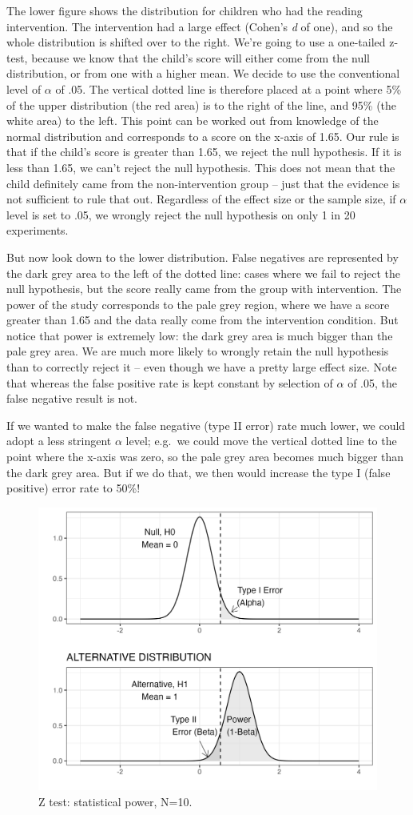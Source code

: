 \documentclass{krantz}
\begin{document}
The lower figure shows the distribution for children who had the reading intervention. The intervention had a large effect (Cohen's \emph{d} of one), and so the whole distribution is shifted over to the right. We're going to use a one-tailed z-test, because we know that the child's score will either come from the null distribution, or from one with a higher mean. We decide to use the conventional level of \(\alpha\) of .05. The vertical dotted line is therefore placed at a point where 5\% of the upper distribution (the red area) is to the right of the line, and 95\% (the white area) to the left. This point can be worked out from knowledge of the normal distribution and corresponds to a score on the x-axis of 1.65. Our rule is that if the child's score is greater than 1.65, we reject the null hypothesis. If it is less than 1.65, we can't reject the null hypothesis. This does not mean that the child definitely came from the non-intervention group -- just that the evidence is not sufficient to rule that out. Regardless of the effect size or the sample size, if \(\alpha\) level is set to .05, we wrongly reject the null hypothesis on only 1 in 20 experiments.

But now look down to the lower distribution. False negatives are represented by the dark grey area to the left of the dotted line: cases where we fail to reject the null hypothesis, but the score really came from the group with intervention. The power of the study corresponds to the pale grey region, where we have a score greater than 1.65 and the data really come from the intervention condition. But notice that power is extremely low: the dark grey area is much bigger than the pale grey area. We are much more likely to wrongly retain the null hypothesis than to correctly reject it -- even though we have a pretty large effect size. Note that whereas the false positive rate is kept constant by selection of \(\alpha\) of .05, the false negative result is not.

If we wanted to make the false negative (type II error) rate much lower, we could adopt a less stringent \(\alpha\) level; e.g.~we could move the vertical dotted line to the point where the x-axis was zero, so the pale grey area becomes much bigger than the dark grey area. But if we do that, we then would increase the type I (false positive) error rate to 50\%!

\begin{figure}
\includegraphics[width=0.6\linewidth]{images_bw/densplot2} \caption{Z test: statistical power, N=10.}\label{fig:densplot2}
\end{figure}
\end{document}

